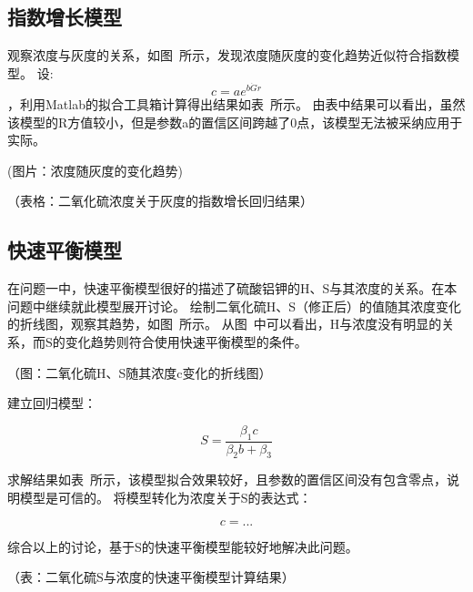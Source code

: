 \subsection{指数增长模型}

观察浓度与灰度的关系，如图~所示，发现浓度随灰度的变化趋势近似符合指数模型。
设: $$c=ae^{b\dot Gr}$$，利用Matlab的拟合工具箱计算得出结果如表~所示。
由表中结果可以看出，虽然该模型的R方值较小，但是参数a的置信区间跨越了0点，该模型无法被采纳应用于实际。

(图片：浓度随灰度的变化趋势)

（表格：二氧化硫浓度关于灰度的指数增长回归结果）



\subsection{快速平衡模型}

在问题一中，快速平衡模型很好的描述了硫酸铝钾的H、S与其浓度的关系。在本问题中继续就此模型展开讨论。
绘制二氧化硫H、S（修正后）的值随其浓度变化的折线图，观察其趋势，如图~所示。
从图~中可以看出，H与浓度没有明显的关系，而S的变化趋势则符合使用快速平衡模型的条件。

（图：二氧化硫H、S随其浓度c变化的折线图）

建立回归模型：


   $$ S = \frac{\beta_1 c}{\beta_2b+\beta_3}$$


求解结果如表~所示，该模型拟合效果较好，且参数的置信区间没有包含零点，说明模型是可信的。
将模型转化为浓度关于S的表达式：


    $$c = ...$$


综合以上的讨论，基于S的快速平衡模型能较好地解决此问题。

（表：二氧化硫S与浓度的快速平衡模型计算结果）
